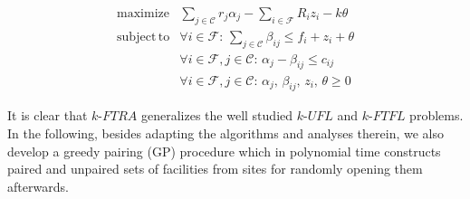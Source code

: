 \documentclass[10pt]{llncs}
\begin{document}
\begin{equation}
\begin{array}{llc}
\textrm{maximize} & \sum_{j\in\mathcal{C}}r_{j}\alpha_{j}-\sum_{i\in\mathcal{F}}R_{i}z_{i}-k\theta\\
\mathrm{subject\, to} & \forall i\in\mathcal{F}:\,\sum_{j\in\mathcal{C}}\beta_{ij}\leq f_{i}+z_{i}+\theta\\
 & \forall i\in\mathcal{F},j\in\mathcal{C}:\,\alpha_{j}-\beta_{ij}\leq c_{ij}\\
 & \forall i\in\mathcal{F},j\in\mathcal{C}:\,\alpha_{j},\,\beta_{ij},\, z_{i},\,\theta\geq0
\end{array}\label{eq:kftra-dual}
\end{equation}


It is clear that $k$-$FTRA$ generalizes the well studied $k$-$UFL$
\cite{jain01approximation,Jain03dualfitting} and $k$-$FTFL$ \cite{Swamy08FTFL2.076}
problems. In the following, besides adapting the algorithms and analyses
therein, we also develop a greedy pairing (GP) procedure which in
polynomial time constructs paired and unpaired sets of facilities
from sites for randomly opening them afterwards.
\end{document}
